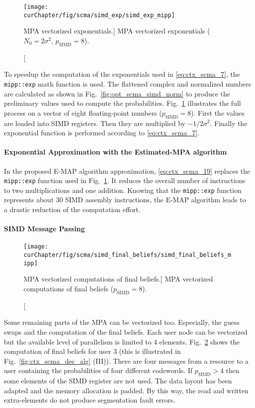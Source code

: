 \begin{figure}[htp]
  \centering
  \texttt{[image: \\curChapter/fig/scma/simd\_exp/simd\_exp\_mipp]}
  \caption
    [MPA vectorized exponentials.]
    {MPA vectorized exponentials ($N_0 = 2\sigma^2$, $p_\text{SIMD} = 8$).}
  \label{fig:opt_scma_simd_exp}
\end{figure}

To speedup the computation of the exponentials used in \eqref{eq:ctx_scma_7},
the \verb|mipp::exp| math function is used. The flattened complex and normalized
numbers are calculated as shown in Fig.~\ref{fig:opt_scma_simd_norm} to produce
the preliminary values used to compute the probabilities.
Fig.~\ref{fig:opt_scma_simd_exp} illustrates the full process on a vector of
eight floating-point numbers ($p_\text{SIMD} = 8$). First the values are loaded
into SIMD registers. Then they are multiplied by $-1/2\sigma^2$. Finally the
exponential function is performed according to \eqref{eq:ctx_scma_7}.

\paragraph{Exponential Approximation with the Estimated-MPA algorithm}

In the proposed E-MAP algorithm approximation, \eqref{eq:ctx_scma_19} replaces
the \verb|mipp::exp| function used in Fig.~\ref{fig:opt_scma_simd_exp}. It
reduces the overall number of instructions to two multiplications and one
addition. Knowing that the \verb|mipp::exp| function represents about 30 SIMD
assembly instructions, the E-MAP algorithm leads to a drastic reduction of the
computation effort.

\paragraph{SIMD Message Passing}

\begin{figure}[htp]
  \centering
  \texttt{[image: \\curChapter/fig/scma/simd\_final\_beliefs/simd\_final\_beliefs\_mipp]}
  \caption
    [MPA vectorized computations of final beliefs.]
    {MPA vectorized computations of final beliefs ($p_\text{SIMD} = 8$).}
  \label{fig:opt_scma_simd_final_guess}
\end{figure}

Some remaining parts of the MPA can be vectorized too. Especially, the guess
swaps and the computation of the final beliefs. Each user node can be
vectorized but the available level of parallelism is limited to 4 elements.
Fig.~\ref{fig:opt_scma_simd_final_guess} shows the computation of final beliefs
for user 3 (this is illustrated in Fig.~\ref{fig:ctx_scma_dec_alg} (III)).
There are four messages from a resource to a user containing the probabilities
of four different codewords. If $p_\text{SIMD} > 4$ then some elements of the
SIMD register are not used. The data layout has been adapted and the memory
allocation is padded. By this way, the read and written extra-elements do not
produce segmentation fault errors.

